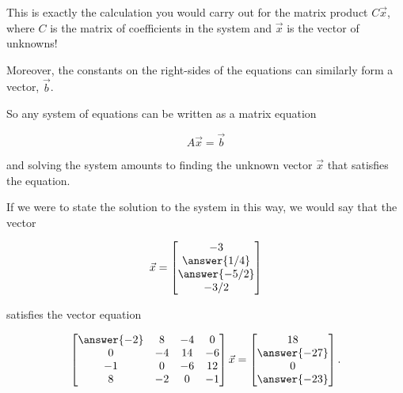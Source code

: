 \documentclass{ximera}
\begin{document}
\begin{example}
\begin{remark}
This is exactly the calculation you would carry out for the matrix product $C\vec{x}$, where $C$ is the matrix of coefficients in the system and $\vec{x}$ is the vector of unknowns!

Moreover, the constants on the right-sides of the equations can similarly form a vector, $\vec{b}$. 

So any system of equations can be written as a matrix equation

$$A\vec{x} = \vec{b}$$

and solving the system amounts to finding the unknown vector $\vec{x}$ that satisfies the equation.

If we were to state the solution to the system in this way, we would say that the vector

$$\vec{x} = \begin{bmatrix}-3 \\ \answer{1/4}\\\answer{-5/2}\\-3/2\end{bmatrix}$$

satisfies the vector equation 

$$\begin{bmatrix}\answer{-2} & 8 & -4 & 0 \\ 0 & -4 & 14 & -6 \\ -1 & 0 & -6 & 12 \\ 8 & -2 & 0 & -1\end{bmatrix}\vec{x} = \begin{bmatrix}18 \\ \answer{-27}\\0\\\answer{-23}\end{bmatrix}.$$


\end{remark}

\end{example}
\end{document}
